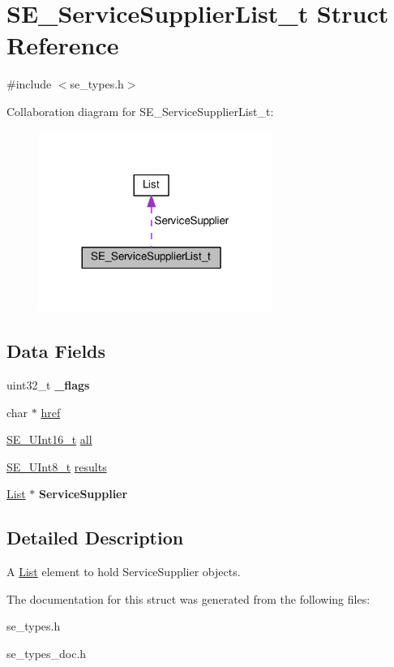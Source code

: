 \hypertarget{structSE__ServiceSupplierList__t}{}\section{S\+E\+\_\+\+Service\+Supplier\+List\+\_\+t Struct Reference}
\label{structSE__ServiceSupplierList__t}


{\ttfamily \#include $<$se\+\_\+types.\+h$>$}



Collaboration diagram for S\+E\+\_\+\+Service\+Supplier\+List\+\_\+t\+:\nopagebreak
\begin{figure}[H]
\begin{center}
\leavevmode
\includegraphics[width=216pt]{structSE__ServiceSupplierList__t__coll__graph}
\end{center}
\end{figure}
\subsection*{Data Fields}
\begin{DoxyCompactItemize}
\item 
uint32\+\_\+t {\bfseries \+\_\+flags}
\item 
char $\ast$ \hyperlink{group__ServiceSupplierList_gacfc612acee8ca5e00775dea00a91b6a6}{href}
\item 
\hyperlink{group__UInt16_gac68d541f189538bfd30cfaa712d20d29}{S\+E\+\_\+\+U\+Int16\+\_\+t} \hyperlink{group__ServiceSupplierList_ga0c0d5b0fd6e9dd514527dc1e7f955d42}{all}
\item 
\hyperlink{group__UInt8_gaf7c365a1acfe204e3a67c16ed44572f5}{S\+E\+\_\+\+U\+Int8\+\_\+t} \hyperlink{group__ServiceSupplierList_ga4fba3923e5af63d5f73c91930a2c9534}{results}
\item 
\hyperlink{structList}{List} $\ast$ {\bfseries Service\+Supplier}
\end{DoxyCompactItemize}


\subsection{Detailed Description}
A \hyperlink{structList}{List} element to hold Service\+Supplier objects. 

The documentation for this struct was generated from the following files\+:\begin{DoxyCompactItemize}
\item 
se\+\_\+types.\+h\item 
se\+\_\+types\+\_\+doc.\+h\end{DoxyCompactItemize}
